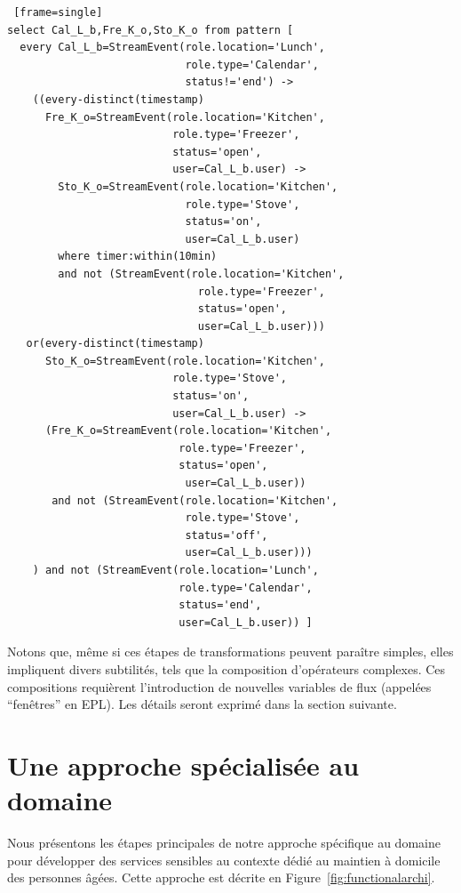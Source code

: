 \begin{footnotesize}
\begin{lstlisting} [frame=single]
select Cal_L_b,Fre_K_o,Sto_K_o from pattern [ 
  every Cal_L_b=StreamEvent(role.location='Lunch',
                            role.type='Calendar',
                            status!='end') -> 
    ((every-distinct(timestamp)
      Fre_K_o=StreamEvent(role.location='Kitchen',
                          role.type='Freezer',
                          status='open',
                          user=Cal_L_b.user) -> 
        Sto_K_o=StreamEvent(role.location='Kitchen',
                            role.type='Stove',
                            status='on',
                            user=Cal_L_b.user) 
        where timer:within(10min)
        and not (StreamEvent(role.location='Kitchen',
                              role.type='Freezer',
                              status='open',
                              user=Cal_L_b.user))) 
   or(every-distinct(timestamp)
      Sto_K_o=StreamEvent(role.location='Kitchen',
                          role.type='Stove',
                          status='on',
                          user=Cal_L_b.user) -> 
      (Fre_K_o=StreamEvent(role.location='Kitchen',
                           role.type='Freezer',
                           status='open',
                            user=Cal_L_b.user)) 
       and not (StreamEvent(role.location='Kitchen',
                            role.type='Stove',
                            status='off',
                            user=Cal_L_b.user))) 
    ) and not (StreamEvent(role.location='Lunch',
                           role.type='Calendar',
                           status='end',
                           user=Cal_L_b.user)) ]
\end{lstlisting}
\end{footnotesize}

Notons que, même si ces étapes de transformations peuvent paraître simples, elles impliquent divers subtilités, tels que la composition d'opérateurs complexes. Ces compositions requièrent l'introduction de nouvelles variables de flux (appelées ``fenêtres'' en EPL). Les détails seront exprimé dans la section suivante.

\section{Une approche spécialisée au domaine}
Nous présentons les étapes principales de notre approche spécifique au domaine pour développer des services sensibles au contexte dédié au maintien à domicile des personnes âgées. Cette approche est décrite en Figure~\ref{fig:functionalarchi}.

